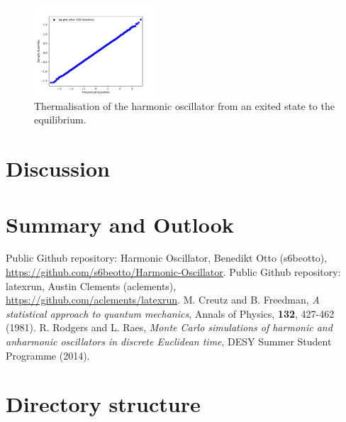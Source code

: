 \documentclass{article}
\begin{document}
\begin{figure}[htbp]
		\includegraphics[width=0.4\textwidth]{../imgs/harmonic_oscillator_track/track_10010000_qq_100.pdf}
		\caption{Thermalisation of the harmonic oscillator from an exited state to the equilibrium.}
	\end{figure}
	\section{Discussion}
	\section{Summary and Outlook}
	\begin{thebibliography}{widestlabel}
		 Public Github repository: Harmonic Oscillator, Benedikt Otto (s6beotto), \\\url{https://github.com/s6beotto/Harmonic-Oscillator}.
		 Public Github repository: latexrun, Austin Clements (aclements), \\\url{https://github.com/aclements/latexrun}.
		 M. Creutz and B. Freedman, \textit{A statistical approach to quantum mechanics}, Annals of Physics, \textbf{132}, 427-462 (1981).
		 R. Rodgers and L. Raes, \textit{Monte Carlo simulations of harmonic and anharmonic oscillators in discrete Euclidean time}, DESY Summer Student Programme (2014).
	\end{thebibliography}
	\appendix
	\section{Directory structure}
\end{document}

